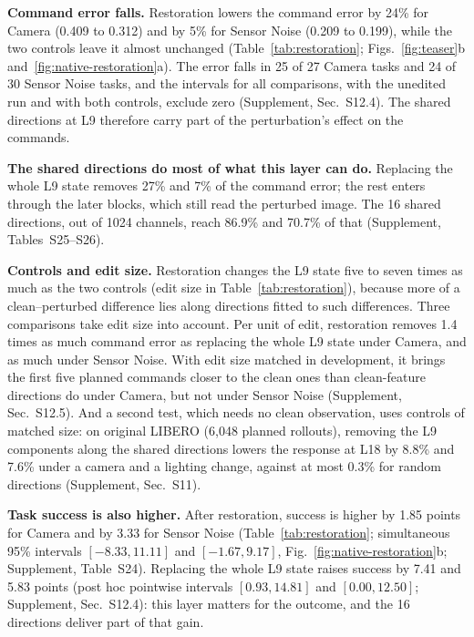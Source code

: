 \textbf{Command error falls.} Restoration lowers the command error by 24\% for Camera (0.409 to 0.312) and by 5\% for Sensor Noise (0.209 to 0.199), while the two controls leave it almost unchanged (Table~\ref{tab:restoration}; Figs.~\ref{fig:teaser}b and~\ref{fig:native-restoration}a). The error falls in 25 of 27 Camera tasks and 24 of 30 Sensor Noise tasks, and the intervals for all comparisons, with the unedited run and with both controls, exclude zero (Supplement, Sec.~S12.4). The shared directions at L9 therefore carry part of the perturbation's effect on the commands.

\textbf{The shared directions do most of what this layer can do.} Replacing the whole L9 state removes 27\% and 7\% of the command error; the rest enters through the later blocks, which still read the perturbed image. The 16 shared directions, out of 1024 channels, reach 86.9\% and 70.7\% of that (Supplement, Tables~S25--S26).

\textbf{Controls and edit size.} Restoration changes the L9 state five to seven times as much as the two controls (edit size in Table~\ref{tab:restoration}), because more of a clean--perturbed difference lies along directions fitted to such differences. Three comparisons take edit size into account. Per unit of edit, restoration removes 1.4 times as much command error as replacing the whole L9 state under Camera, and as much under Sensor Noise. With edit size matched in development, it brings the first five planned commands closer to the clean ones than clean-feature directions do under Camera, but not under Sensor Noise (Supplement, Sec.~S12.5). And a second test, which needs no clean observation, uses controls of matched size: on original LIBERO (6,048 planned rollouts), removing the L9 components along the shared directions lowers the response at L18 by 8.8\% and 7.6\% under a camera and a lighting change, against at most 0.3\% for random directions (Supplement, Sec.~S11).

\textbf{Task success is also higher.} After restoration, success is higher by 1.85 points for Camera and by 3.33 for Sensor Noise (Table~\ref{tab:restoration}; simultaneous 95\% intervals $[-8.33,11.11]$ and $[-1.67,9.17]$, Fig.~\ref{fig:native-restoration}b; Supplement, Table~S24). Replacing the whole L9 state raises success by 7.41 and 5.83 points (post hoc pointwise intervals $[0.93,14.81]$ and $[0.00,12.50]$; Supplement, Sec.~S12.4): this layer matters for the outcome, and the 16 directions deliver part of that gain.
